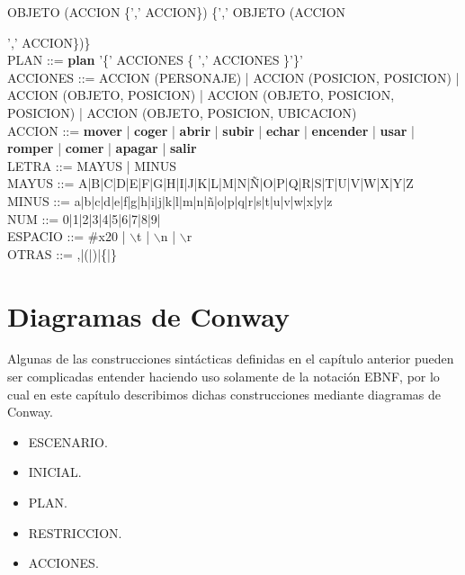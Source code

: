 \documentclass[11pt,a4paper,spanish,twoside]{book}
\theoremstyle{plain} \newtheorem{nota}{Nota}
\begin{document}
OBJETO (ACCION \{',' ACCION\}) \{',' OBJETO (ACCION {',' ACCION\})\}
\\
PLAN ::= \textbf{plan} '\{' ACCIONES \{ ',' ACCIONES \}'\}'
\\ 
ACCIONES ::= ACCION (PERSONAJE) | ACCION (POSICION, POSICION) | 
ACCION (OBJETO, POSICION) | ACCION (OBJETO, POSICION, POSICION) | 
ACCION (OBJETO, POSICION, UBICACION)
\\
ACCION ::= \textbf{mover} | \textbf{coger} | \textbf{abrir} | \textbf{subir} | 
\textbf{echar} | \textbf{encender} | \textbf{usar} | \textbf{romper} | 
\textbf{comer} | \textbf{apagar} | \textbf{salir}
\\
LETRA ::= MAYUS | MINUS
\\
MAYUS ::= A|B|C|D|E|F|G|H|I|J|K|L|M|N|Ñ|O|P|Q|R|S|T|U|V|W|X|Y|Z
\\
MINUS ::= a|b|c|d|e|f|g|h|i|j|k|l|m|n|ñ|o|p|q|r|s|t|u|v|w|x|y|z
\\
NUM ::= 0|1|2|3|4|5|6|7|8|9|
\\
ESPACIO ::= \#x20 | $\backslash$t | $\backslash$n | $\backslash$r
\\
OTRAS ::= ,|(|)|\{|\}

\chapter{Diagramas de Conway}
Algunas de las construcciones sintácticas definidas en el capítulo anterior
pueden ser complicadas entender haciendo uso solamente de la notación EBNF,
por lo cual en este capítulo describimos dichas construcciones mediante
diagramas de Conway.

\begin{itemize}
\item ESCENARIO.
\item INICIAL.
\item PLAN.
\item RESTRICCION.
 {}
\item ACCIONES.
\end{itemize}

}
\end{document}
